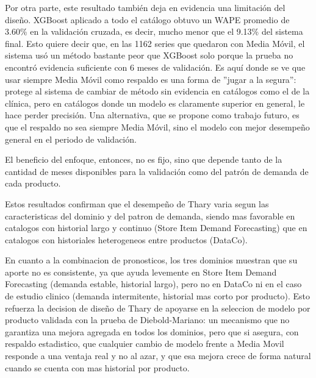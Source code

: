 Por otra parte, este resultado también deja en evidencia una limitación del diseño. XGBoost aplicado a todo el catálogo obtuvo un WAPE promedio de 3.60\% en la validación cruzada, es decir, mucho menor que el 9.13\% del sistema final. Esto quiere decir que, en las 1162 series que quedaron con Media Móvil, el sistema usó un método bastante peor que XGBoost solo porque la prueba no encontró evidencia suficiente con 6 meses de validación. Es aquí donde se ve que usar siempre Media Móvil como respaldo es una forma de ”jugar a la segura”: protege al sistema de cambiar de método sin evidencia en catálogos como el de la clínica, pero en catálogos donde un modelo es claramente superior en general, le hace perder precisión. Una alternativa, que se propone como trabajo futuro, es que el respaldo no sea siempre Media Móvil, sino el modelo con mejor desempeño general en el periodo de validación.

El beneficio del enfoque, entonces, no es fijo, sino que depende tanto de la cantidad de meses disponibles para la validación como del patrón de demanda de cada producto.

Estos resultados confirman que el desempeño de Thary varia segun las caracteristicas del dominio y del patron de demanda, siendo mas favorable en catalogos con historial largo y continuo (Store Item Demand Forecasting) que en catalogos con historiales heterogeneos entre productos (DataCo).

En cuanto a la combinacion de pronosticos, los tres dominios muestran que su aporte no es consistente, ya que ayuda levemente en Store Item Demand Forecasting (demanda estable, historial largo), pero no en DataCo ni en el caso de estudio clinico (demanda intermitente, historial mas corto por producto). Esto refuerza la decision de diseño de Thary de apoyarse en la seleccion de modelo por producto validada con la prueba de Diebold-Mariano: un mecanismo que no garantiza una mejora agregada en todos los dominios, pero que si asegura, con respaldo estadistico, que cualquier cambio de modelo frente a Media Movil responde a una ventaja real y no al azar, y que esa mejora crece de forma natural cuando se cuenta con mas historial por producto.